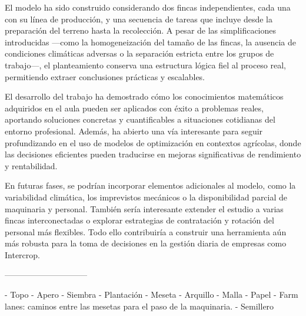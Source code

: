 El modelo ha sido construido considerando dos fincas independientes, cada una con su línea de producción,
y una secuencia de tareas que incluye desde la preparación del terreno hasta la recolección.
A pesar de las simplificaciones introducidas —como la homogeneización del tamaño de las fincas,
la ausencia de condiciones climáticas adversas o la separación estricta entre los grupos de trabajo—, el planteamiento conserva una estructura lógica fiel al proceso real,
permitiendo extraer conclusiones prácticas y escalables.

El desarrollo del trabajo ha demostrado cómo los conocimientos matemáticos adquiridos en el aula pueden ser aplicados con éxito a problemas reales,
aportando soluciones concretas y cuantificables a situaciones cotidianas del entorno profesional.
Además, ha abierto una vía interesante para seguir profundizando en el uso de modelos de optimización en contextos agrícolas,
donde las decisiones eficientes pueden traducirse en mejoras significativas de rendimiento y rentabilidad.

En futuras fases, se podrían incorporar elementos adicionales al modelo, como la variabilidad climática,
los imprevistos mecánicos o la disponibilidad parcial de maquinaria y personal.
También sería interesante extender el estudio a varias fincas interconectadas o explorar estrategias de contratación y rotación del personal más flexibles.
Todo ello contribuiría a construir una herramienta aún más robusta para la toma de decisiones en la gestión diaria de empresas como Intercrop.

\newpage
------------------------------

- Topo
- Apero
- Siembra
- Plantación
- Meseta
- Arquillo
- Malla
- Papel
- Farm lanes: caminos entre las mesetas para el paso de la maquinaria.
- Semillero
